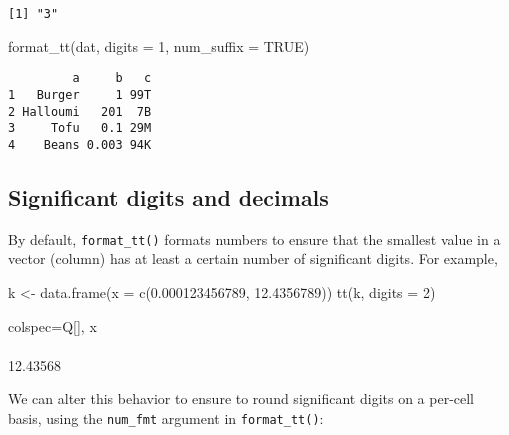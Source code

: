 \documentclass[
  letterpaper,
  DIV=11,
  numbers=noendperiod]{scrartcl}
\newenvironment{Shaded}{\begin{snugshade}}{\end{snugshade}}
\newcommand{\AttributeTok}[1]{\textcolor[rgb]{0.40,0.45,0.13}{#1}}
\newcommand{\ConstantTok}[1]{\textcolor[rgb]{0.56,0.35,0.01}{#1}}
\newcommand{\DecValTok}[1]{\textcolor[rgb]{0.68,0.00,0.00}{#1}}
\newcommand{\FloatTok}[1]{\textcolor[rgb]{0.68,0.00,0.00}{#1}}
\newcommand{\FunctionTok}[1]{\textcolor[rgb]{0.28,0.35,0.67}{#1}}
\newcommand{\NormalTok}[1]{\textcolor[rgb]{0.00,0.23,0.31}{#1}}
\newcommand{\OtherTok}[1]{\textcolor[rgb]{0.00,0.23,0.31}{#1}}
\begin{document}
\begin{verbatim}
[1] "3"
\end{verbatim}

\begin{Shaded}
\begin{Highlighting}[]
\FunctionTok{format\_tt}\NormalTok{(dat, }\AttributeTok{digits =} \DecValTok{1}\NormalTok{, }\AttributeTok{num\_suffix =} \ConstantTok{TRUE}\NormalTok{)}
\end{Highlighting}
\end{Shaded}

\begin{verbatim}
         a     b   c
1   Burger     1 99T
2 Halloumi   201  7B
3     Tofu   0.1 29M
4    Beans 0.003 94K
\end{verbatim}

\subsection{Significant digits and
decimals}\label{significant-digits-and-decimals}

By default, \texttt{format\_tt()} formats numbers to ensure that the
smallest value in a vector (column) has at least a certain number of
significant digits. For example,

\begin{Shaded}
\begin{Highlighting}[]
\NormalTok{k }\OtherTok{\textless{}{-}} \FunctionTok{data.frame}\NormalTok{(}\AttributeTok{x =} \FunctionTok{c}\NormalTok{(}\FloatTok{0.000123456789}\NormalTok{, }\FloatTok{12.4356789}\NormalTok{))}
\FunctionTok{tt}\NormalTok{(k, }\AttributeTok{digits =} \DecValTok{2}\NormalTok{)}
\end{Highlighting}
\end{Shaded}

\begin{table}[H]
\centering
\begin{tblr}[         %
]                     %
{                     %
colspec={Q[]},
}                     %
\toprule
x \\  \\
12.43568 \\
\bottomrule
\end{tblr}
\end{table}

We can alter this behavior to ensure to round significant digits on a
per-cell basis, using the \texttt{num\_fmt} argument in
\texttt{format\_tt()}:
\end{document}
